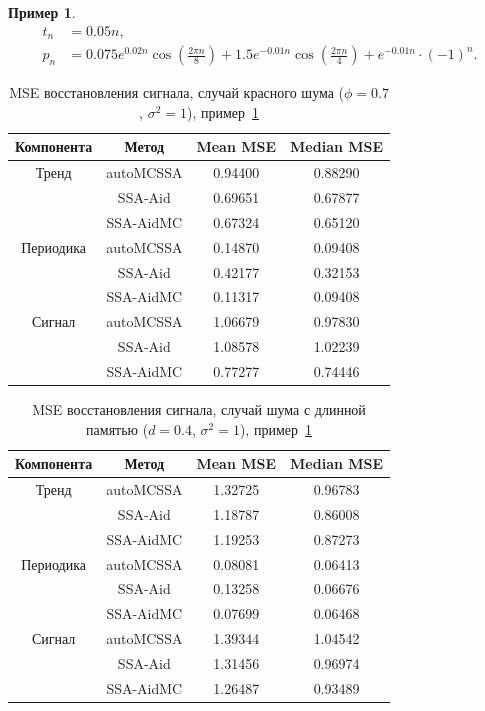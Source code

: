 \documentclass[specialist,
substylefile = spbu_report.rtx,
subf,12pt]{disser}
\theoremstyle{definition}
\newtheorem{example}{Пример}[chapter]
\begin{document}
\begin{example}\label{eg:signal4}
	\begin{align*}
		t_n & = 0.05n,\\
		p_n & = 0.075 e^{0.02n}\cos\left(\frac{2 \pi n}{8}\right) + 1.5e^{-0.01n}\cos\left(\frac{2 \pi n}{4}\right) + e^{-0.01n}\cdot (-1)^n.
	\end{align*}

	\begin{table}[h!]
		\centering
		\caption{MSE восстановления сигнала, случай красного шума ($\phi=0.7$, $\sigma^2=1$), пример~\ref{eg:signal4}}
		\label{tab:mse_signal4_rn}
		\begin{tabular}{c|c|c|c}
			Компонента & Метод & Mean MSE & Median MSE \\
			\hline
			Тренд & autoMCSSA & 0.94400  & 0.88290 \\
			& SSA-Aid & 0.69651  & 0.67877 \\
			& SSA-AidMC & 0.67324  & 0.65120 \\
			\hline
			Периодика & autoMCSSA & 0.14870  & 0.09408 \\
			& SSA-Aid & 0.42177  & 0.32153 \\
			& SSA-AidMC & 0.11317  & 0.09408 \\
			\hline
			Сигнал & autoMCSSA & 1.06679  & 0.97830 \\
			& SSA-Aid & 1.08578  & 1.02239 \\
			& SSA-AidMC & 0.77277  & 0.74446 \\
		\end{tabular}
	\end{table}

	\begin{table}[h!]
		\centering
		\caption{MSE восстановления сигнала, случай шума с длинной памятью ($d=0.4$, $\sigma^2=1$), пример~\ref{eg:signal4}}
		\label{tab:mse_signal4_fi}
		\begin{tabular}{c|c|c|c}
			Компонента & Метод & Mean MSE & Median MSE \\
			\hline
			Тренд & autoMCSSA & 1.32725  & 0.96783 \\
			& SSA-Aid & 1.18787  & 0.86008 \\
			& SSA-AidMC & 1.19253  & 0.87273 \\
			\hline
			Периодика & autoMCSSA & 0.08081  & 0.06413 \\
			& SSA-Aid & 0.13258  & 0.06676 \\
			& SSA-AidMC & 0.07699  & 0.06468 \\
			\hline
			Сигнал & autoMCSSA & 1.39344  & 1.04542 \\
			& SSA-Aid & 1.31456  & 0.96974 \\
			& SSA-AidMC & 1.26487  & 0.93489 \\
		\end{tabular}
	\end{table}
\end{example}
\end{document}
